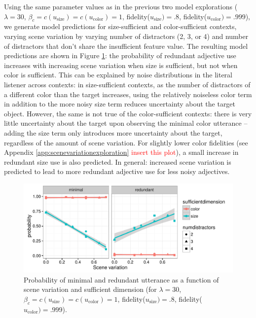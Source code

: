 \documentclass[11pt]{article}
\newcommand{\red}[1]{\textcolor{Red}{#1}}
\newcommand{\figref}[1]{Figure \ref{#1}}
\newcommand{\appref}[1]{Appendix \ref{#1}}
\begin{document}
Using the same parameter values as in the previous two model explorations ($\lambda = 30$, $ \beta_c = c(u_{\textrm{size}}) = c(u_{\textrm{color}}) = 1$, fidelity($u_{\textrm{size}}) = .8$, fidelity($u_{\textrm{color}}) = .999$), we generate model predictions for size-sufficient and color-sufficient contexts, varying scene variation by varying number of distractors (2, 3, or 4) and number of distractors that don't share the insufficient feature value. The resulting model predictions are shown in \figref{fig:numdistractors}: the probability of redundant adjective use increases with increasing scene variation when size is sufficient, but not when color is sufficient. This can be explained by noise distributions in the literal listener across contexts: in size-sufficient contexts, as the number of distractors of a different color than the target increases, using the relatively noiseless color term in addition to the more noisy size term reduces uncertainty about the target object. However, the same is not true of the color-sufficient contexts: there is very little uncertainty about the target upon observing the minimal color utterance -- adding the size term only introduces more uncertainty about the target, regardless of the amount of scene variation. For slightly lower color fidelities (see \appref{app:scenevariationexploration} \red{insert this plot}), a small increase in redundant size use is also predicted. In general: increased scene variation is predicted to lead to more redundant adjective use for less noisy adjectives.

\begin{figure}
\centering
\includegraphics[width=.9\textwidth]{pics/scenevariation-effect}
\caption{Probability of minimal and redundant utterance as a function of scene variation and sufficient dimension (for $\lambda = 30$, $ \beta_c = c(u_{\textrm{size}}) = c(u_{\textrm{color}}) = 1$, fidelity($u_{\textrm{size}}) = .8$, fidelity($u_{\textrm{color}}) = .999$).}
\label{fig:numdistractors}
\end{figure}
\end{document}
